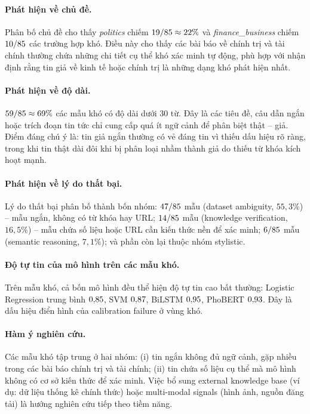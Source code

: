 \paragraph{Phát hiện về chủ đề.} Phân bố chủ đề cho thấy \textit{politics} chiếm $19{}/85{} \approx 22\%$ và \textit{finance\_business} chiếm $10{}/85{}$ các trường hợp khó. Điều này cho thấy các bài báo về chính trị và tài chính thường chứa những chi tiết cụ thể khó xác minh tự động, phù hợp với nhận định rằng tin giả về kinh tế hoặc chính trị là những dạng khó phát hiện nhất.

\paragraph{Phát hiện về độ dài.} $59{}/85{} \approx 69\%$ các mẫu khó có độ dài dưới 30 từ. Đây là các tiêu đề, câu dẫn ngắn hoặc trích đoạn tin tức chỉ cung cấp quá ít ngữ cảnh để phân biệt thật -- giả. Điểm đáng chú ý là: tin giả ngắn thường có vẻ đáng tin vì thiếu dấu hiệu rõ ràng, trong khi tin thật dài đôi khi bị phân loại nhầm thành giả do thiếu từ khóa kích hoạt mạnh.

\paragraph*{Phát hiện về lý do thất bại.} Lý do thất bại phân bố thành bốn nhóm: $47{}/85$ mẫu (dataset ambiguity, $55{,}3\%$) -- mẫu ngắn, không có từ khóa hay URL; $14{}/85$ mẫu (knowledge verification, $16{,}5\%$) -- mẫu chứa số liệu hoặc URL cần kiến thức nền để xác minh; $6{}/85$ mẫu (semantic reasoning, $7{,}1\%$); và phần còn lại thuộc nhóm stylistic.

\paragraph*{Độ tự tin của mô hình trên các mẫu khó.} Trên \nhardexamples{} mẫu khó, cả bốn mô hình đều thể hiện độ tự tin cao bất thường: Logistic Regression trung bình $0{,}85$, SVM $0{,}87$, BiLSTM $0{,}95$, PhoBERT $0{,}93$. Đây là dấu hiệu điển hình của calibration failure ở vùng khó.

\paragraph*{Hàm ý nghiên cứu.} Các mẫu khó tập trung ở hai nhóm: (i) tin ngắn không đủ ngữ cảnh, gặp nhiều trong các bài báo chính trị và tài chính; (ii) tin chứa số liệu cụ thể mà mô hình không có cơ sở kiến thức để xác minh. Việc bổ sung external knowledge base (ví dụ: dữ liệu thống kê chính thức) hoặc multi-modal signals (hình ảnh, nguồn đăng tải) là hướng nghiên cứu tiếp theo tiềm năng.

